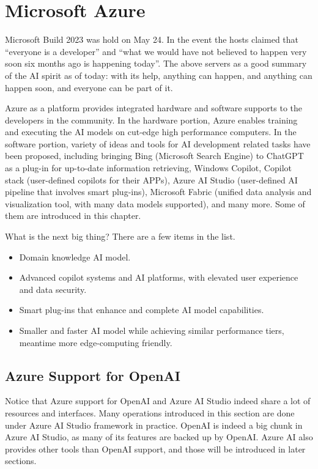 \chapter{Microsoft Azure} \label{ch:azure}

Microsoft Build 2023 was hold on May 24. In the event the hosts claimed that ``everyone is a developer'' and ``what we would have not believed to happen very soon six months ago is happening today''. The above servers as a good summary of the AI spirit as of today: with its help, anything can happen, and anything can happen soon, and everyone can be part of it.

Azure as a platform provides integrated hardware and software supports to the developers in the community. In the hardware portion, Azure enables training and executing the AI models on cut-edge high performance computers. In the software portion, variety of ideas and tools for AI development related tasks have been proposed, including bringing Bing (Microsoft Search Engine) to ChatGPT as a plug-in for up-to-date information retrieving, Windows Copilot, Copilot stack (user-defined copilots for their APPs), Azure AI Studio (user-defined AI pipeline that involves smart plug-ins), Microsoft Fabric (unified data analysis and visualization tool, with many data models supported), and many more. Some of them are introduced in this chapter.

What is the next big thing? There are a few items in the list.
\begin{itemize}
  \item Domain knowledge AI model.
  \item Advanced copilot systems and AI platforms, with elevated user experience and data security.
  \item Smart plug-ins that enhance and complete AI model capabilities.
  \item Smaller and faster AI model while achieving similar performance tiers, meantime more edge-computing friendly.
\end{itemize}

\section{Azure Support for OpenAI}

Notice that Azure support for OpenAI and Azure AI Studio indeed share a lot of resources and interfaces. Many operations introduced in this section are done under Azure AI Studio framework in practice. OpenAI is indeed a big chunk in Azure AI Studio, as many of its features are backed up by OpenAI. Azure AI also provides other tools than OpenAI support, and those will be introduced in later sections.

